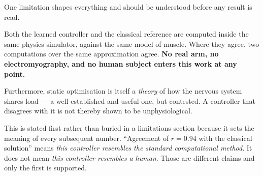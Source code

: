 One limitation shapes everything and should be understood before any result is
read.

Both the learned controller and the classical reference are computed inside the
same physics simulator, against the same model of muscle. Where they agree, two
computations over the same approximation agree. \textbf{No real arm, no
electromyography, and no human subject enters this work at any point.}

Furthermore, static optimisation is itself a \emph{theory} of how the nervous
system shares load --- a well-established and useful one, but contested. A
controller that disagrees with it is not thereby shown to be unphysiological.

\begin{why}
This is stated first rather than buried in a limitations section because it sets
the meaning of every subsequent number. ``Agreement of $r = 0.94$ with the
classical solution'' means \emph{this controller resembles the standard
computational method}. It does not mean \emph{this controller resembles a human}.
Those are different claims and only the first is supported.
\end{why}
